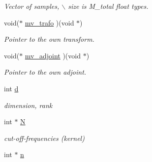 \begin{CompactItemize}
\begin{CompactList}\small\item\em Vector of samples, $\backslash$ size is M\_\-total float types. \item\end{CompactList}\item 
\hypertarget{structnfct__plan_5f9802e95bfc2ae69f22e91c1fe47778}{
void($\ast$ \hyperlink{structnfct__plan_5f9802e95bfc2ae69f22e91c1fe47778}{mv\_\-trafo} )(void $\ast$)}
\label{structnfct__plan_5f9802e95bfc2ae69f22e91c1fe47778}

\begin{CompactList}\small\item\em Pointer to the own transform. \item\end{CompactList}\item 
\hypertarget{structnfct__plan_ab8ee071a4e254cbf94a03689ed3127f}{
void($\ast$ \hyperlink{structnfct__plan_ab8ee071a4e254cbf94a03689ed3127f}{mv\_\-adjoint} )(void $\ast$)}
\label{structnfct__plan_ab8ee071a4e254cbf94a03689ed3127f}

\begin{CompactList}\small\item\em Pointer to the own adjoint. \item\end{CompactList}\item 
\hypertarget{structnfct__plan_998a428a06532646854e8add72c5ca63}{
int \hyperlink{structnfct__plan_998a428a06532646854e8add72c5ca63}{d}}
\label{structnfct__plan_998a428a06532646854e8add72c5ca63}

\begin{CompactList}\small\item\em dimension, rank \item\end{CompactList}\item 
\hypertarget{structnfct__plan_d4d0600d8b0ee9d41bff22a7d63e64cf}{
int $\ast$ \hyperlink{structnfct__plan_d4d0600d8b0ee9d41bff22a7d63e64cf}{N}}
\label{structnfct__plan_d4d0600d8b0ee9d41bff22a7d63e64cf}

\begin{CompactList}\small\item\em cut-off-frequencies (kernel) \item\end{CompactList}\item 
\hypertarget{structnfct__plan_0ad3d47d659b3641bb90eca6e56f9047}{
int $\ast$ \hyperlink{structnfct__plan_0ad3d47d659b3641bb90eca6e56f9047}{n}}
\label{structnfct__plan_0ad3d47d659b3641bb90eca6e56f9047}


\end{CompactItemize}
